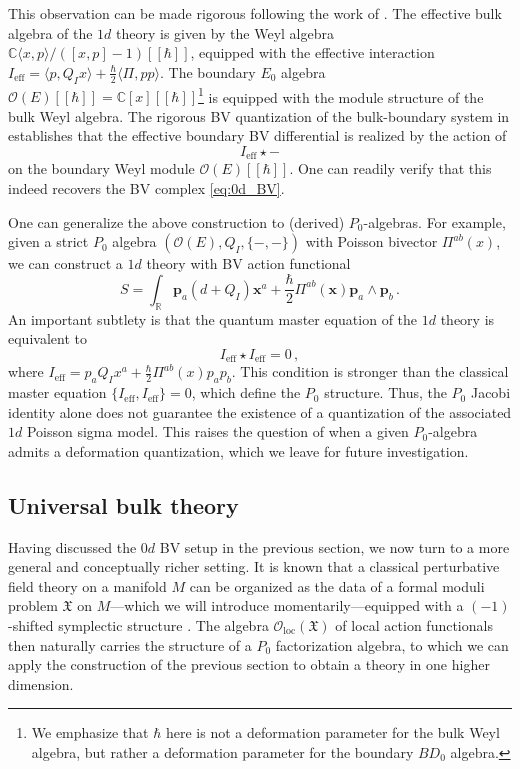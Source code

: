 \documentclass[11pt]{article}
\newcommand{\C}{\mathbb{C}}
\newcommand{\R}{\mathbb{R}}
\numberwithin{equation}{section}
\begin{document}
This observation can be made rigorous following the work of \cite{grady2017batalin,Wang:2024sqm,wang2025perturbative}. The effective bulk algebra of the $1d$ theory is given by the Weyl algebra $\C\langle x,p\rangle/([x,p] - 1)[[\hbar]]$, equipped with the effective interaction $I_{\mathrm{eff}} = \langle p, Q_I x\rangle + \frac{\hbar}{2}\langle \Pi, pp\rangle $. The boundary $E_0$ algebra $\mathcal{O}(E)[[\hbar]] = \C[x][[\hbar]]$\;\footnote{We emphasize that $\hbar$ here is not a deformation parameter for the bulk Weyl algebra, but rather a deformation parameter for the boundary $BD_0$ algebra.} is equipped with the module structure of the bulk Weyl algebra. The rigorous BV quantization of the bulk-boundary system in \cite{Wang:2024sqm,wang2025perturbative} establishes that the effective boundary BV differential is realized by the action of
\begin{equation}
	I_{\mathrm{eff}}\star-
\end{equation}
on the boundary Weyl module $\mathcal{O}(E)[[\hbar]]$. One can readily verify that this indeed recovers the BV complex \eqref{eq:0d_BV}.


One can generalize the above construction to (derived) $P_0$-algebras. For example, given a strict $P_0$ algebra $(\mathcal{O}(E),Q_I,\{-,-\})$ with Poisson bivector $\Pi^{ab}(x)$, we can construct a $1d$ theory with BV action functional
\begin{equation}
	S = \int_{\R} \boldsymbol{p}_a  (d + Q_I) \boldsymbol{x}^a +\frac{\hbar}{2}\Pi^{ab}(\boldsymbol{x}) \boldsymbol{p}_a \wedge \boldsymbol{p}_b\,.
\end{equation}
An important subtlety is that the quantum master equation of the $1d$ theory is equivalent to
\begin{equation}
I_{\mathrm{eff}}\star I_{\mathrm{eff}} = 0\,,
\end{equation}
where $I_{\mathrm{eff}} = p_a Q_Ix^a +\frac{\hbar}{2}\Pi^{ab}(x) p_a p_b$. This condition is stronger than the classical master equation $\{I_{\mathrm{eff}},I_{\mathrm{eff}}\}=0$, which define the $P_0$ structure. Thus, the $P_0$ Jacobi identity alone does not guarantee the existence of a quantization of the associated $1d$ Poisson sigma model. This raises the question of when a given $P_0$-algebra admits a deformation quantization, which we leave for future investigation.

\subsection{Universal bulk theory}
Having discussed the $0d$ BV setup in the previous section, we now turn to a more general and conceptually richer setting. It is known that a classical perturbative field theory on a manifold $M$ can be organized as the data of a formal moduli problem $\mathfrak{X}$ on $M$—which we will introduce momentarily—equipped with a $(-1)$-shifted symplectic structure \cite{costello2017factorization}. The algebra $\mathcal{O}_{\mathrm{loc}}(\mathfrak{X})$ of local action functionals then naturally carries the structure of a $P_0$ factorization algebra, to which we can apply the construction of the previous section to obtain a theory in one higher dimension.
\end{document}
